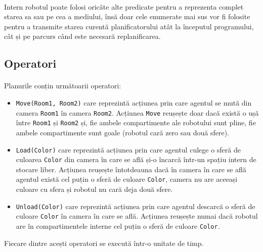 \documentclass[12pt]{article}
\newcommand{\repr}[1]{{\color{sapphire}\texttt{#1}}}
\begin{document}
\paragraph{}

Intern robotul poate folosi oricâte alte predicate pentru a reprezenta
complet starea sa sau pe cea a mediului, însă doar cele enumerate mai
sus vor fi folosite pentru a transmite starea curentă planificatorului
atât la începutul programului, cât și pe parcurs când este necesară
replanificarea.

\subsection{Operatori}
\label{sec:operatori}

\paragraph{}

Planurile conțin următoarii operatori:
\begin{itemize}
\item \repr{Move(Room1, Room2)} care reprezintă acțiunea prin care
  agentul se mută din camera \repr{Room1} în camera \repr{Room2}.
  Acțiunea \repr{Move} reușește doar dacă există o ușă între
  \repr{Room1} și \repr{Room2} și, fie ambele compartimente ale
  robotului sunt pline, fie ambele compartimente sunt goale (robotul
  cară zero sau două sfere).
\item \repr{Load(Color)} care reprezintă acțiunea prin care agentul
  culege o sferă de culoarea \repr{Color} din camera în care se află
  și-o încarcă într-un spațiu intern de stocare liber. Acțiunea
  reușește întotdeauna dacă în camera în care se află agentul există
  cel puțin o sferă de culoare \repr{Color}, camera nu are aceeași
  culoare cu sfera și robotul nu cară deja două sfere.
\item \repr{Unload(Color)} care reprezintă acțiunea prin care
  agentul descarcă o sferă de culoare \repr{Color} în camera în care
  se află. Acțiunea reușește numai dacă robotul are în compartimentele
  interne cel puțin o sferă de culoare \repr{Color}.
\end{itemize}

Fiecare dintre acești operatori se execută într-o unitate de timp.

\paragraph{}
\end{document}
